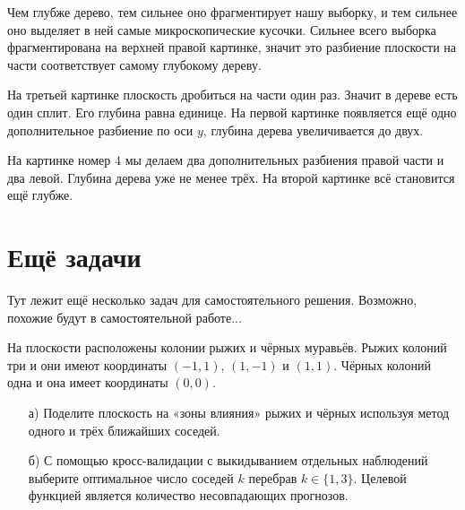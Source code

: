 \documentclass[12pt, a4paper, oneside]{article}
\theoremstyle{plain} %
\theoremstyle{definition}
\newcounter{problem}%
\renewcommand{\theproblem}{\arabic{problem}}
\newenvironment{problem}[1]{
\addtocounter{problem}{1}\noindent{ \color{titleblue} \large \bfseries Упражнение~\theproblem~#1 \vspace{1ex} \newline}
}{ }
\begin{document}
\begin{solution}
Чем глубже дерево, тем сильнее оно фрагментирует нашу выборку, и тем сильнее оно выделяет в ней самые микроскопические кусочки.  Сильнее всего выборка фрагментирована на верхней правой картинке, значит это разбиение плоскости на части соответствует самому глубокому дереву. 

На третьей картинке плоскость дробиться на части один раз. Значит в дереве есть один сплит. Его глубина равна единице. На первой картинке появляется ещё одно дополнительное разбиение по оси $y$, глубина дерева увеличивается до двух. 

На картинке номер $4$ мы делаем два дополнительных разбиения правой части и два левой. Глубина дерева уже не менее трёх. На второй картинке всё становится ещё глубже. 
\end{solution}

\section*{Ещё задачи} 

Тут лежит ещё несколько задач для самостоятельного решения. Возможно, похожие будут в самостоятельной работе... 

\begin{problem}{}
На плоскости расположены колонии рыжих и чёрных муравьёв. Рыжих колоний три и они имеют координаты $(-1, 1)$, $(1, -1)$ и $(1, 1)$. Чёрных колоний одна и она имеет координаты $(0, 0)$.

\begin{enumerate}
\item[а)] Поделите плоскость на «зоны влияния» рыжих и чёрных используя метод одного и трёх ближайших соседей.

\item[б)] С помощью кросс-валидации с выкидыванием отдельных наблюдений выберите оптимальное число соседей $k$ перебрав $k \in \{1, 3 \}$. Целевой функцией является количество несовпадающих прогнозов.
\end{enumerate}
\end{problem}
\end{document}
